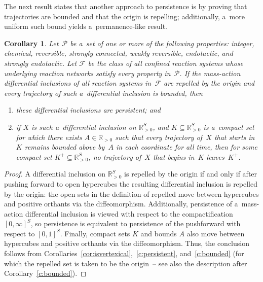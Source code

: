 \documentclass[pdftex]{sigma}
\newtheorem{Corollary}[Theorem]{Corollary}
\begin{document}
The next result states that another approach to persistence is by proving that trajectories are bounded and that the
origin is repelling; additionally, a~more uniform such bound yields a~permanence-like result.
\begin{Corollary}
\label{cor:persistent}
Let~$\mathcal P$ be a~set of one or more of the following properties: integer, chemical, reversible, strongly
connected, weakly reversible, endotactic, and strongly endotactic.
Let $\mathcal F$ be the class of all confined reaction systems whose underlying reaction networks satisfy every
property in~$\mathcal P$.
If the mass-action differential inclusions of all reaction systems in~$\mathcal F$ are repelled by the origin and
every trajectory of such a~differential inclusion is bounded, then
\begin{enumerate}\itemsep=0pt
\item[$1)$] these differential inclusions are persistent; and
\item[$2)$] if $X$ is such a~differential inclusion on
$\mathbb{R}_{>0}^S$, and $K\subseteq\mathbb{R}_{>0}^S$ is a~compact set for which there exists $A\in\mathbb{R}_{>0}$ such
that every trajectory of~$X$ that starts in~$K$ remains bounded above by~$A$ in each coordinate for all time, then for
some compact set $K^+\subseteq\mathbb{R}_{>0}^S$, no trajectory of~$X$ that begins in~$K$ leaves~$K^+$.
\end{enumerate}
\end{Corollary}
\begin{proof}
A dif\/ferential inclusion on $\mathbb{R}_{>0}^{S}$ is repelled by the origin if and only if after pushing forward to
open hypercubes the resulting dif\/ferential inclusion is repelled by the origin: the open sets in the def\/inition of
repelled move between hypercubes and positive orthants via the dif\/feomorphism.
Additionally, persistence of a~mass-action dif\/ferential inclusion is viewed with respect to the compactif\/ication
$[0,\infty]^{S}$, so persistence is equivalent to persistence of the pushforward with respect to $[0,1]^{S}$.
Finally, compact sets $K$ and bounds $A$ also move between hypercubes and positive orthants via the dif\/feomorphism.
Thus, the conclusion follows from Corollaries~\ref{cor:isvertexical},~\ref{c:persistent}, and~\ref{c:bounded} (for
which the repelled set is taken to be the origin~-- see also the description after Corollary~\ref{c:bounded}).
\end{proof}
\end{document}
